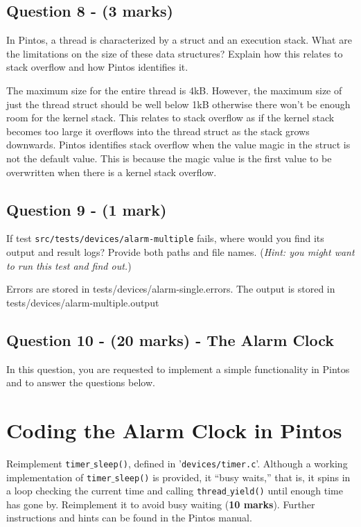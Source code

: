 \documentclass[a4paper,12pt]{article}
\begin{document}
\subsection*{Question 8 - (3 marks)}
In Pintos, a thread is characterized by a struct and an execution stack. 
What are the limitations on the size of these data structures? 
Explain how this relates to stack overflow and how Pintos identifies it.

The maximum size for the entire thread is 4kB. However, the maximum size of just the thread struct should be well below 1kB otherwise there won't be enough room for the kernel stack. This relates to stack overflow as if the kernel stack becomes too large it overflows into the thread struct as the stack grows downwards. Pintos identifies stack overflow when the value magic in the struct is not the default value. This is because the magic value is the first value to be overwritten when there is a kernel stack overflow.\\

\subsection*{Question 9 - (1 mark)}
If test \texttt{src/tests/devices/alarm-multiple} fails, where would you find its output and result logs? 
Provide both paths and file names.
(\textit{Hint: you might want to run this test and find out.}) 

Errors are stored in tests/devices/alarm-single.errors.
The output is stored in tests/devices/alarm-multiple.output\\

\subsection*{Question 10 - (20 marks) - The Alarm Clock}
In this question, you are requested to implement a simple functionality in Pintos and to answer the questions below.

\section*{Coding the Alarm Clock in Pintos} 
Reimplement \texttt{timer$\_$sleep()}, defined in '\texttt{devices/timer.c}’. 
Although a working implementation of \texttt{timer$\_$sleep()} is provided, it “busy waits,” that is, it spins in a loop checking the current time and calling \texttt{thread$\_$yield()} until enough time has gone by. 
Reimplement it to avoid busy waiting ({\bf 10 marks}). 
Further instructions and hints can be found in the Pintos manual.
\end{document}
